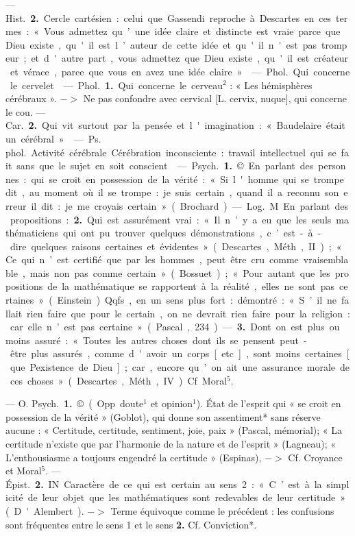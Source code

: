 \begin{itemize}[leftmargin=1cm, label=, itemsep=11pt]
— \si{Hist.}  {\bf 2.} Cercle cartésien : celui
que Gassendi reproche à Descartes
en ces termes : « Vous admettez
qu’une idée claire et distincte est
vraie parce que Dieu existe, qu'il
est l’auteur de cette idée et qu'il
n'est pas trompeur; et d'autre part,
vous admettez que Dieu existe, qu'il
est créateur et vérace, parce que
vous en avez une idée claire. »

 — \si{Phol.} Qui concerne
le cervelet.

 — \si{Phol.} {\bf 1.} Qui concerne le
cerveau$^2$ : « Les hémisphères cérébraux ». $->$ Ne pas confondre avec
cervical [L. cervix, nuque], qui concerne le cou. — \si{Car.}  {\bf 2.} Qui vit surtout par la pensée et l'imagination :
« Baudelaire était un cérébral. »

 — \si{Ps. phol.} Activité
cérébrale. Cérébration inconsciente :
travail intellectuel qui se fait sans
que le sujet en soit conscient.

 — \si{Psych.} {\bf 1.} © En parlant des
personnes : qui se croit en possession de la vérité : « Si l'homme qui se
trompe dit, au moment où il se
trompe : je suis certain, quand il a
reconnu son erreur il dit : je me
croyais certain » (Brochard).

— \si{Log.} M En parlant des propositions :  {\bf 2.} Qui est assurément vrai:
« Il n’y a eu que les seuls mathématiciens qui ont pu trouver quelques
démonstrations, c’est-à-dire quelques
raisons certaines et évidentes »
(Descartes, Méth., II); « Ce qui n’est
certifié que par les hommes, peut
être cru comme vraisemblable, mais
non pas comme certain » (Bossuet);
« Pour autant que les propositions
de la mathématique se rapportent
à la réalité, elles ne sont pas certaines » (Einstein). Qqfs., en un sens
plus fort : démontré : « S’il ne fallait
rien faire que pour le certain, on ne
devrait rien faire pour la religion:
car elle n’est pas certaine » (Pascal,
234). —  {\bf 3.} Dont on est plus ou
moins assuré : « Toutes les autres
choses dont ils se pensent peut-être
plus assurés, comme d'avoir un
corps [etc.], sont moins certaines
[que Pexistence de Dieu]; car, encore
qu’on ait une assurance morale de
ces choses... » (Descartes, Méth., IV).
Cf. Moral$^5$.

 — O. \si{Psych.} {\bf 1.} © (Opp.
doute$^1$ et opinion$^1$). État de l’esprit
qui « se croit en possession de la
vérité » (Goblot), qui donne son
assentiment* sans réserve aucune :
« Certitude, certitude, sentiment,
joie, paix » (Pascal, mémorial); « La
certitude n'existe que par l’harmonie de la nature et de l'esprit »
(Lagneau); « L’enthousiasme a toujours engendré la certitude » (Espinas), $->$ Cf. Croyance et Moral$^5$.
— \si{Épist.}  {\bf 2.} IN Caractère de ce qui
est certain au sens 2 : « C’est à la
simplicité de leur objet que les mathématiques sont redevables de leur
certitude » (D'Alembert). $->$ Terme
équivoque comme le précédent : les
confusions sont fréquentes entre le
sens 1 et le sens  {\bf 2.} Cf. Conviction*.


\end{itemize}
